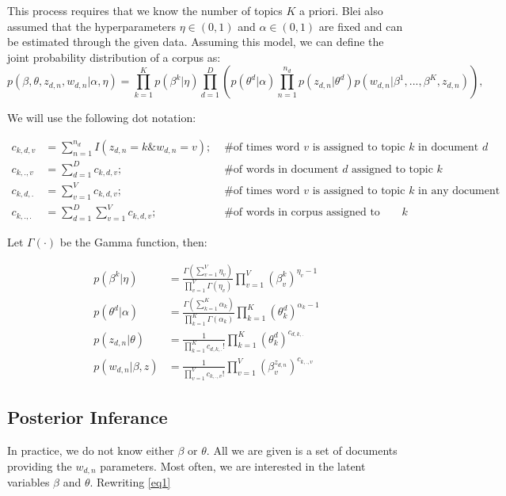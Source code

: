 \documentclass[3p,times]{elsarticle}
\begin{document}
This process requires that we know the number of topics $K$ a priori. Blei also assumed that the hyperparameters $\eta \in  (0,1)$ and $\alpha \in (0,1)$ are fixed and can be estimated through the given data. Assuming this model, we can define the joint probability distribution of a corpus as:
\begin{equation} \label{eq1}
p(\beta,\theta,z_{d,n},w_{d,n} | \alpha,\eta) = \prod_{k=1}^{K}{p(\beta^{k} | \eta)}  \prod_{d=1}^{D}\left( p(\theta^{d} | \alpha) \prod_{n=1}^{n_{d}}{p(z_{d,n} | \theta^{d})}p(w_{d,n} | \beta^{1},...,\beta^{K},z_{d,n}) \right)  ,
\end{equation}

We will use the following dot notation:

\begin{align*}
c_{k,d,v}&=\sum_{n=1}^{n_{d}}{I(z_{d,n}=k \& w_{d,n}=v)}; &\text{ \# of times word $v$ is assigned to topic $k$ in document $d$} \\
c_{k,.,v}&=\sum_{d=1}^{D}{c_{k,d,v}}; &\text{ \# of words in document $d$ assigned to topic $k$} \\
c_{k,d,.}&=\sum_{v=1}^{V}{c_{k,d,v}}; &\text{ \# of times word $v$ is assigned to topic $k$ in any document} \\
c_{k,.,.}&=\sum_{d=1}^{D}\sum_{v=1}^{V}{c_{k,d,v}}; &\text{ \# of words in corpus assigned to topic $k$} 
\end{align*}


Let $\Gamma(\cdot)$ be the Gamma function, then:

\begin{align*}
p(\beta^{k} | \eta) &=\frac{ \Gamma( \sum_{v=1}^{V}{ \eta_{v} } )}{ \prod_{v=1}^{V}{\Gamma(\eta_{v})}}  
\prod_{v=1}^{V}{(\beta^{k}_{v})^{\eta_{v}-1}} \\
p(\theta^{d} | \alpha) &=\frac {\Gamma( \sum_{k=1}^{K}{ \alpha_{k} } )}{ \prod_{k=1}^{K}{\Gamma(\alpha_{k})}}  
\prod_{k=1}^{K}{(\theta^{d}_{k})^{\alpha_{k}-1}} \\
p(z_{d,n} | \theta) &=\frac{1}{\prod_{k=1}^{K}{c_{d,k,.}!}}
\prod_{k=1}^{K}{(\theta^{d}_{k})^{c_{d,k,.}}} \\
p(w_{d,n} | \beta,z) &=\frac{1}{\prod_{v=1}^{V}{c_{k,.,v}!}}\prod_{v=1}^{V}{
(\beta^{z_{d,n}}_{v})^{c_{k,.,v}}}
\end{align*}

\subsection{Posterior Inferance}
In practice, we do not know either $\beta$ or $\theta$. All we are given is a set of documents providing the $w_{d,n}$ parameters. Most often, we are interested in the latent variables $\beta$ and $\theta$. Rewriting \ref{eq1}
\end{document}
